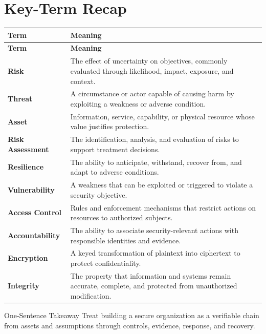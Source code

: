 \documentclass[11pt,letterpaper]{article}
\begin{document}
\section*{Key-Term Recap}
\begin{longtable}{>{\raggedright\arraybackslash}p{}>{\raggedright\arraybackslash}p{}}
\toprule\rowcolor{Navy}\color{white}\textbf{Term} & \color{white}\textbf{Meaning}\\\midrule
\endfirsthead
\toprule\rowcolor{Navy}\color{white}\textbf{Term} & \color{white}\textbf{Meaning}\\\midrule
\endhead
\textbf{Risk} & The effect of uncertainty on objectives, commonly evaluated through likelihood, impact, exposure, and context. \\\midrule
\textbf{Threat} & A circumstance or actor capable of causing harm by exploiting a weakness or adverse condition. \\\midrule
\textbf{Asset} & Information, service, capability, or physical resource whose value justifies protection. \\\midrule
\textbf{Risk Assessment} & The identification, analysis, and evaluation of risks to support treatment decisions. \\\midrule
\textbf{Resilience} & The ability to anticipate, withstand, recover from, and adapt to adverse conditions. \\\midrule
\textbf{Vulnerability} & A weakness that can be exploited or triggered to violate a security objective. \\\midrule
\textbf{Access Control} & Rules and enforcement mechanisms that restrict actions on resources to authorized subjects. \\\midrule
\textbf{Accountability} & The ability to associate security-relevant actions with responsible identities and evidence. \\\midrule
\textbf{Encryption} & A keyed transformation of plaintext into ciphertext to protect confidentiality. \\\midrule
\textbf{Integrity} & The property that information and systems remain accurate, complete, and protected from unauthorized modification. \\\midrule
\bottomrule
\end{longtable}
\begin{CornellExamBox}{One-Sentence Takeaway}
Treat building a secure organization as a verifiable chain from assets and assumptions through controls, evidence, response, and recovery.
\end{CornellExamBox}
\end{document}

